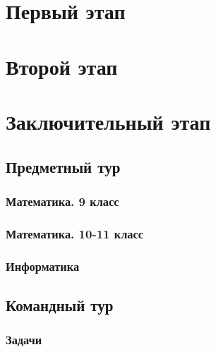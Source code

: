 \documentclass[a4paper,12pt,oneside]{book}
\begin{document}

\setcounter{tocdepth}{1}

\tableofcontents

\part{Первый этап}




\part{Второй этап}




\part{Заключительный этап}

\clearpage
\chapter{Предметный тур}

\section{Математика. 9 класс}


\section{Математика. 10-11 класс}


\section{Информатика}


\chapter{Командный тур}

\section{Задачи} 


\end{document}

